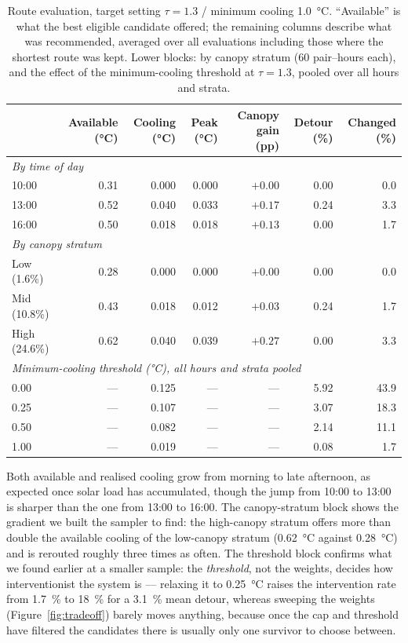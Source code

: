 \documentclass[10pt]{article}   %
\begin{document}
\begin{table}[H]
\centering
\caption{Route evaluation, target setting $\tau = 1.3$ / minimum cooling \SI{1.0}{\celsius}.
``Available'' is what the best eligible candidate offered; the remaining columns describe
what was recommended, averaged over all evaluations including those where the shortest
route was kept. Lower blocks: by canopy stratum (60 pair--hours each), and the effect of the
minimum-cooling threshold at $\tau = 1.3$, pooled over all hours and strata.}
\label{tab:routes}
\small
\begin{tabular}{lrrrrrr}
\toprule
& Available (\si{\celsius}) & Cooling (\si{\celsius}) & Peak (\si{\celsius}) &
Canopy gain (pp) & Detour (\%) & Changed (\%) \\
\midrule
\multicolumn{7}{l}{\emph{By time of day}} \\
10:00 & 0.31 & 0.000 & 0.000 & $+0.00$ & 0.00 & 0.0 \\
13:00 & 0.52 & 0.040 & 0.033 & $+0.17$ & 0.24 & 3.3 \\
16:00 & 0.50 & 0.018 & 0.018 & $+0.13$ & 0.00 & 1.7 \\
\midrule
\multicolumn{7}{l}{\emph{By canopy stratum}} \\
Low (1.6\%)   & 0.28 & 0.000 & 0.000 & $+0.00$ & 0.00 & 0.0 \\
Mid (10.8\%)  & 0.43 & 0.018 & 0.012 & $+0.03$ & 0.24 & 1.7 \\
High (24.6\%) & 0.62 & 0.040 & 0.039 & $+0.27$ & 0.00 & 3.3 \\
\midrule
\multicolumn{7}{l}{\emph{Minimum-cooling threshold (\si{\celsius}), all hours and strata pooled}} \\
0.00 & --- & 0.125 & --- & --- & 5.92 & 43.9 \\
0.25 & --- & 0.107 & --- & --- & 3.07 & 18.3 \\
0.50 & --- & 0.082 & --- & --- & 2.14 & 11.1 \\
1.00 & --- & 0.019 & --- & --- & 0.08 & 1.7 \\
\bottomrule
\end{tabular}
\end{table}

Both available and realised cooling grow from morning to late afternoon, as expected once
solar load has accumulated, though the jump from 10:00 to 13:00 is sharper than the one from
13:00 to 16:00. The canopy-stratum block shows the gradient we built the sampler to find: the
high-canopy stratum offers more than double the available cooling of the low-canopy stratum
(\SI{0.62}{\celsius} against \SI{0.28}{\celsius}) and is rerouted roughly three times as
often. The threshold block confirms what we found earlier at a smaller sample: the
\emph{threshold}, not the weights, decides how interventionist the system is --- relaxing it
to \SI{0.25}{\celsius} raises the intervention rate from \SI{1.7}{\percent} to
\SI{18}{\percent} for a \SI{3.1}{\percent} mean detour, whereas sweeping the weights
(Figure~\ref{fig:tradeoff}) barely moves anything, because once the cap and threshold have
filtered the candidates there is usually only one survivor to choose between.
\end{document}
